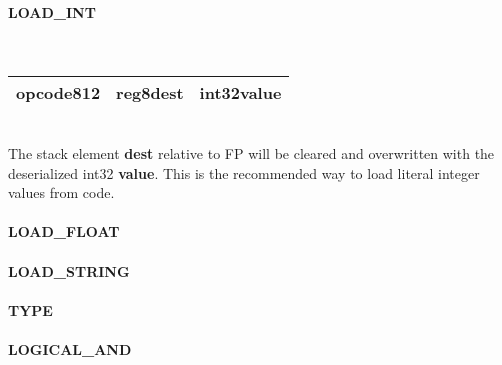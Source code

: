 \documentclass[12pt,a4paper]{article}
\begin{document}
\vspace{2em}\begin{minipage}{\textwidth}
\paragraph{LOAD\_INT}
~\vspace{1em}\\\begin{tabular}{|p{2cm}|p{2cm}|p{8cm}|}
\hline
opcode8\newline\textbf{12} & reg8\newline\textbf{dest} & int32\newline\textbf{value} \\
\hline
\end{tabular}\vspace{1em}\\
The stack element \textbf{dest} relative to FP will be cleared and overwritten with the deserialized int32 \textbf{value}. This is the recommended way to load literal integer values from code.
\end{minipage}

\vspace{2em}\begin{minipage}{\textwidth}
\paragraph{LOAD\_FLOAT}
\end{minipage}

\vspace{2em}\begin{minipage}{\textwidth}
\paragraph{LOAD\_STRING}
\end{minipage}

\vspace{2em}\begin{minipage}{\textwidth}
\paragraph{TYPE}
\end{minipage}

\vspace{2em}\begin{minipage}{\textwidth}
\paragraph{LOGICAL\_AND}
\end{minipage}
\end{document}
